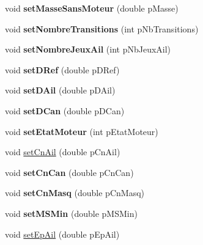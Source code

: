 \begin{DoxyCompactItemize}
void {\bfseries set\+Masse\+Sans\+Moteur} (double p\+Masse)
\item 
\mbox{\label{classpackage_i_h_m_1_1_fusee_a3bdf31ee73dc1106750420449e448651}} 
void {\bfseries set\+Nombre\+Transitions} (int p\+Nb\+Transitions)
\item 
\mbox{\label{classpackage_i_h_m_1_1_fusee_a9954e75785e80ddb121a7e50218baaea}} 
void {\bfseries set\+Nombre\+Jeux\+Ail} (int p\+Nb\+Jeux\+Ail)
\item 
\mbox{\label{classpackage_i_h_m_1_1_fusee_a767306a1f843f3152f9fe8875c630db5}} 
void {\bfseries set\+D\+Ref} (double p\+D\+Ref)
\item 
\mbox{\label{classpackage_i_h_m_1_1_fusee_a4911cc2f18095344dbd65c7934fb3c21}} 
void {\bfseries set\+D\+Ail} (double p\+D\+Ail)
\item 
\mbox{\label{classpackage_i_h_m_1_1_fusee_a882069f16bcea633d504abdf12adb784}} 
void {\bfseries set\+D\+Can} (double p\+D\+Can)
\item 
\mbox{\label{classpackage_i_h_m_1_1_fusee_adee696c2be77ba2bb4c50942a529b8aa}} 
void {\bfseries set\+Etat\+Moteur} (int p\+Etat\+Moteur)
\item 
void \mbox{\hyperlink{classpackage_i_h_m_1_1_fusee_a4932fbd05f898de11de1ada5313f37cb}{set\+Cn\+Ail}} (double p\+Cn\+Ail)
\item 
\mbox{\label{classpackage_i_h_m_1_1_fusee_ac6e57258dd09efd5b0e299fa0812ade8}} 
void {\bfseries set\+Cn\+Can} (double p\+Cn\+Can)
\item 
\mbox{\label{classpackage_i_h_m_1_1_fusee_a4f15756423ff03fbeecf763c68384d72}} 
void {\bfseries set\+Cn\+Masq} (double p\+Cn\+Masq)
\item 
\mbox{\label{classpackage_i_h_m_1_1_fusee_a73408b99915edfdee5af928b1c3d52d8}} 
void {\bfseries set\+M\+S\+Min} (double p\+M\+S\+Min)
\item 
void \mbox{\hyperlink{classpackage_i_h_m_1_1_fusee_a9f238ddf7075ac84479926b56ff34a93}{set\+Ep\+Ail}} (double p\+Ep\+Ail)

\end{DoxyCompactItemize}
